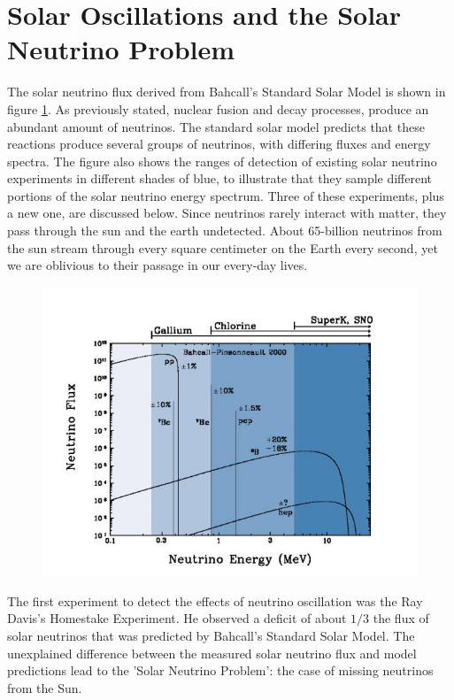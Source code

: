 \section{Solar Oscillations and the Solar Neutrino Problem}

The solar neutrino flux derived from Bahcall's Standard Solar Model is shown in figure \ref{fig:solarmodel}. As previously stated, nuclear fusion and decay processes, produce an abundant amount of neutrinos. The standard solar model predicts that these reactions produce several groups of neutrinos, with differing fluxes and energy spectra. The figure also shows the ranges of detection of existing solar neutrino experiments in different shades of blue, to illustrate that they sample different portions of the solar neutrino energy spectrum. Three of these experiments, plus a new one, are discussed below.
Since neutrinos rarely interact with matter, they pass through the sun and the earth undetected. About 65-billion neutrinos from the sun stream through every square centimeter on the Earth every second, yet we are oblivious to their passage in our every-day lives. \cite{bnl}
\begin{figure}[htp]
\centering
\includegraphics[scale=.55]{figs/solarmodel.jpg}
\label{fig:solarmodel}
\end{figure}

The first experiment to detect the effects of neutrino oscillation was the Ray Davis's Homestake Experiment. He observed a deficit of about $1/3$ the flux of solar neutrinos that was predicted by Bahcall's Standard Solar Model. The unexplained difference between the measured solar neutrino flux and model predictions lead to the 'Solar Neutrino Problem': the case of missing neutrinos from the Sun. \cite{fnal}

